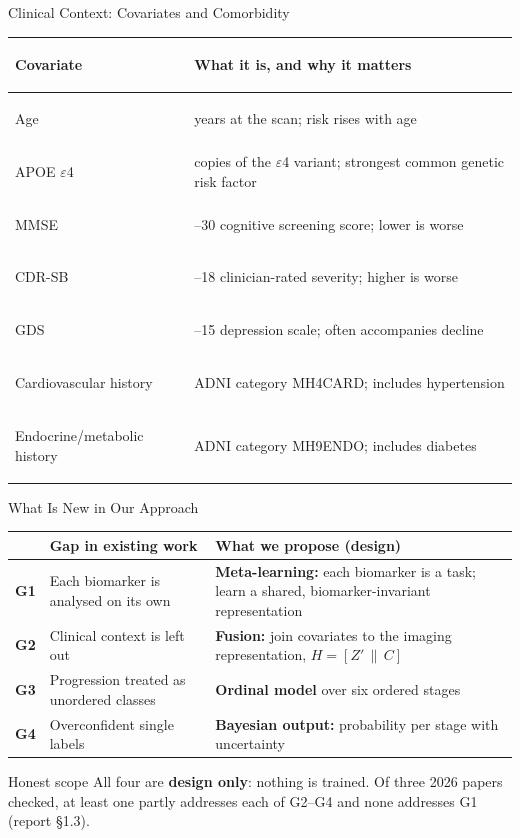 \documentclass[aspectratio=169,11pt]{beamer}
\begin{document}
\begin{frame}{Clinical Context: Covariates and Comorbidity}
  \small
  \renewcommand{\arraystretch}{1.3}
  \begin{tabularx}{\textwidth}{>{\bfseries\raggedright\arraybackslash}p{4.4cm}>{\raggedright\arraybackslash}X}
    \toprule
    Covariate & What it is, and why it matters \\
    \midrule
    Age & years at the scan; risk rises with age \\
    APOE $\varepsilon$4 & copies of the $\varepsilon$4 variant; strongest common genetic risk factor \\
    MMSE & 0--30 cognitive screening score; lower is worse \\
    CDR-SB & 0--18 clinician-rated severity; higher is worse \\
    GDS & 0--15 depression scale; often accompanies decline \\
    Cardiovascular history & ADNI category MH4CARD; includes hypertension \\
    Endocrine/metabolic history & ADNI category MH9ENDO; includes diabetes \\
    \bottomrule
  \end{tabularx}
\end{frame}

\begin{frame}{What Is New in Our Approach}
  \small
  \begin{tabularx}{\textwidth}{>{\bfseries}p{0.8cm}>{\raggedright\arraybackslash}p{5.0cm}>{\raggedright\arraybackslash}X}
    \toprule
    & \textbf{Gap in existing work} & \textbf{What we propose (design)} \\
    \midrule
    G1 & Each biomarker is analysed on its own & \textbf{Meta-learning:} each biomarker is a task; learn a shared, biomarker-invariant representation \\[3pt]
    G2 & Clinical context is left out & \textbf{Fusion:} join covariates to the imaging representation, $H=[Z'\,\|\,C]$ \\[3pt]
    G3 & Progression treated as unordered classes & \textbf{Ordinal model} over six ordered stages \\[3pt]
    G4 & Overconfident single labels & \textbf{Bayesian output:} probability per stage with uncertainty \\
    \bottomrule
  \end{tabularx}
  \vspace{0.25cm}

  \begin{alertblock}{Honest scope}
    \footnotesize All four are \textbf{design only}: nothing is trained. Of three 2026 papers checked,
    at least one partly addresses each of G2--G4 and none addresses G1 (report \S1.3).
  \end{alertblock}
\end{frame}
\end{document}
